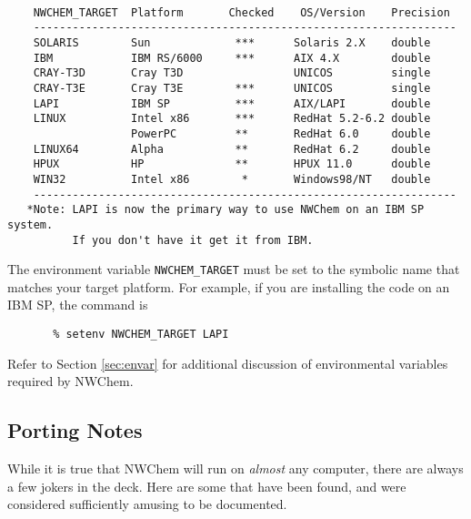 \begin{verbatim}

    NWCHEM_TARGET  Platform       Checked    OS/Version    Precision
    -----------------------------------------------------------------
    SOLARIS        Sun             ***      Solaris 2.X    double
    IBM            IBM RS/6000     ***      AIX 4.X        double
    CRAY-T3D       Cray T3D                 UNICOS         single
    CRAY-T3E       Cray T3E        ***      UNICOS         single
    LAPI           IBM SP          ***      AIX/LAPI       double
    LINUX          Intel x86       ***      RedHat 5.2-6.2 double
                   PowerPC         **       RedHat 6.0     double
    LINUX64        Alpha           **       RedHat 6.2     double
    HPUX           HP              **       HPUX 11.0      double
    WIN32          Intel x86        *       Windows98/NT   double
    -----------------------------------------------------------------
   *Note: LAPI is now the primary way to use NWChem on an IBM SP system.
          If you don't have it get it from IBM. 

\end{verbatim}
The environment variable {\tt NWCHEM\_TARGET} must
be set to the symbolic name
that matches your target platform.  For example, if you are installing
the code on an IBM SP, the command is

\begin{verbatim}
       % setenv NWCHEM_TARGET LAPI
\end{verbatim}

Refer to Section \ref{sec:envar} for additional discussion of environmental variables
required by NWChem.

\subsection{Porting Notes}
\label{sec:PortingNotes}

While it is true that NWChem will run on {\em almost} any computer, there are always
a few jokers in the deck.  Here are some that have been found, and were
considered sufficiently amusing to be documented.

